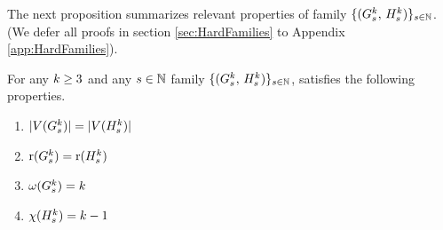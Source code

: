 The next proposition summarizes relevant properties of family $\{(G_s^k,\, H_s^k)\}_{s \in \mathbb{N}}$. (We defer all proofs in section \ref{sec:HardFamilies} to Appendix \ref{app:HardFamilies}).
\begin{proposition}\label{prop:GraphClassGProps}
    For any  $k \geq 3$ and any $s \in \mathbb{N}$ family $\{(G_s^k,\, H_s^k)\}_{s \in \mathbb{N}}$, satisfies the following properties.
    \begin{enumerate}
        \item $|V(G_s^k)|= |V(H_s^k)|$ \label{GraphClassGPropsVertexNum}
        \item $\mathrm{r}(G_s^k)=\mathrm{r}(H_s^k)$\label{GraphClassGPropsRegularity}
        \item $\omega(G_s^k) = k$ \label{GraphClassGPropsCliqueNum}
        \item $\chi(H_s^k) = k-1$ \label{GraphClassGPropsChromaticNum}
    \end{enumerate}
\end{proposition}
    
    
